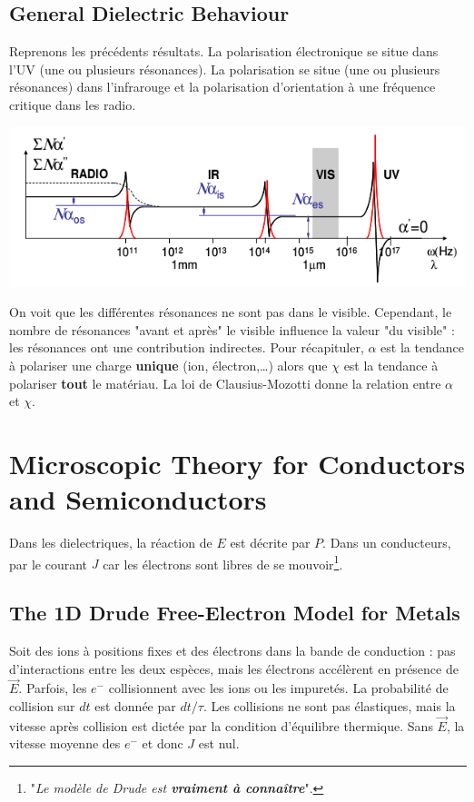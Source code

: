 \subsection{General Dielectric Behaviour}
Reprenons les précédents résultats. La polarisation électronique se situe dans l'UV (une ou plusieurs 
résonances). La polarisation se situe (une ou plusieurs résonances)  dans l’infrarouge et la polarisation 
d'orientation à une fréquence critique dans les radio.
\begin{center}
	\includegraphics[scale=0.6]{ch3/image3.png}
\end{center}
On voit que les différentes résonances ne sont pas dans le visible. Cependant, le nombre de résonances "avant
et après" le visible influence la valeur "du visible" : les résonances ont une contribution indirectes. Pour
récapituler, $\alpha$ est la tendance à polariser une charge \textbf{unique} (ion, électron,\dots) alors que
$\chi$ est la tendance à polariser \textbf{tout} le matériau. La loi de Clausius-Mozotti donne la relation entre
$\alpha$ et $\chi$.


\section{Microscopic Theory for Conductors and Semiconductors}
Dans les dielectriques, la réaction de $E$ est décrite par $P$. Dans un conducteurs, par le courant $J$ car
les électrons sont libres de se mouvoir\footnote{"\textit{Le modèle de Drude est \textbf{vraiment à connaître}}".}.

\subsection{The 1D Drude Free-Electron Model for Metals}
Soit des ions à positions fixes et des électrons dans la bande de conduction : pas d'interactions entre les deux
espèces, mais les électrons accélèrent en présence de $\vec{E}$. Parfois, les $e^-$ collisionnent avec les ions
ou les impuretés. La probabilité de collision sur $dt$ est donnée par $dt/\tau$. Les collisions ne sont pas
élastiques, mais la vitesse après collision est dictée par la condition d'équilibre thermique. Sans $\vec{E}$, 
la vitesse moyenne des $e^-$ et donc $J$ est nul.\\

